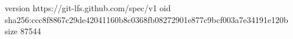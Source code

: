 version https://git-lfs.github.com/spec/v1
oid sha256:ccc8f8867c29de42041160b8c0368fb08272901e877c9bcf003a7e34191e120b
size 87544
